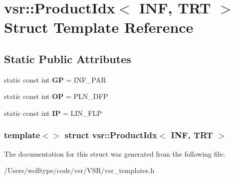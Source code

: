 \hypertarget{structvsr_1_1_product_idx_3_01_i_n_f_00_01_t_r_t_01_4}{\section{vsr\-:\-:Product\-Idx$<$ I\-N\-F, T\-R\-T $>$ Struct Template Reference}
\label{structvsr_1_1_product_idx_3_01_i_n_f_00_01_t_r_t_01_4}
}
\subsection*{Static Public Attributes}
\begin{DoxyCompactItemize}
\item 
\hypertarget{structvsr_1_1_product_idx_3_01_i_n_f_00_01_t_r_t_01_4_a9d6f6efcb99009cbb2f842c07a0d9f76}{static const int {\bfseries G\-P} = I\-N\-F\-\_\-\-P\-A\-R}\label{structvsr_1_1_product_idx_3_01_i_n_f_00_01_t_r_t_01_4_a9d6f6efcb99009cbb2f842c07a0d9f76}

\item 
\hypertarget{structvsr_1_1_product_idx_3_01_i_n_f_00_01_t_r_t_01_4_a11c12486abeeced10b05a1b49334379b}{static const int {\bfseries O\-P} = P\-L\-N\-\_\-\-D\-F\-P}\label{structvsr_1_1_product_idx_3_01_i_n_f_00_01_t_r_t_01_4_a11c12486abeeced10b05a1b49334379b}

\item 
\hypertarget{structvsr_1_1_product_idx_3_01_i_n_f_00_01_t_r_t_01_4_a85bc8b633a3cece62a24208e4800620d}{static const int {\bfseries I\-P} = L\-I\-N\-\_\-\-F\-L\-P}\label{structvsr_1_1_product_idx_3_01_i_n_f_00_01_t_r_t_01_4_a85bc8b633a3cece62a24208e4800620d}

\end{DoxyCompactItemize}
\subsubsection*{template$<$$>$ struct vsr\-::\-Product\-Idx$<$ I\-N\-F, T\-R\-T $>$}



The documentation for this struct was generated from the following file\-:\begin{DoxyCompactItemize}
\item 
/\-Users/wolftype/code/vsr/\-V\-S\-R/vsr\-\_\-templates.\-h\end{DoxyCompactItemize}
